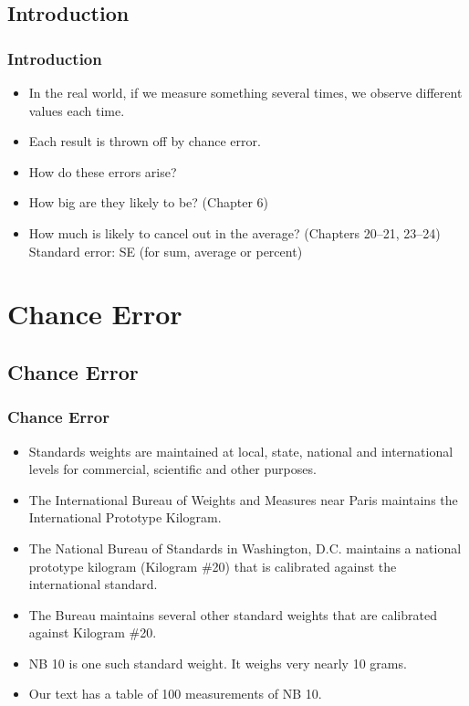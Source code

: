 \documentclass[t]{beamer}
\begin{document}
\subsection{Introduction}
\begin{frame}[t]\frametitle{Introduction}
{\small
\begin{itemize}
\item In the real world, if we measure something several times, we observe
  different values each time.
\item Each result is thrown off by {\color{blue}chance error}.
\item How do these errors arise? 
\item How big are they likely to be? (Chapter 6)
\item How much is likely to cancel out in the average? (Chapters 20--21, 23--24)
\\ Standard error:  SE (for sum, average or percent)
\end{itemize}}

\end{frame}

\section{Chance Error}
\subsection{Chance Error}
\begin{frame}[t]\frametitle{Chance Error}
{\small
\begin{itemize}
\item Standards weights are maintained at local, state, national 
  and international levels for commercial, scientific and other purposes.
\item The International Bureau of Weights and Measures near Paris
  maintains the International Prototype Kilogram.
\item The National Bureau of Standards in Washington, D.C. 
  maintains a national prototype kilogram (Kilogram \#20) 
  that is calibrated against
  the international standard.
\item The Bureau maintains several other standard weights that are
  calibrated against Kilogram \#20.
\item NB 10 is one such standard weight.  It weighs very nearly 10 grams.
\item Our text has a table of 100 measurements of NB 10.
\end{itemize} 
}
\end{frame}
\end{document}
